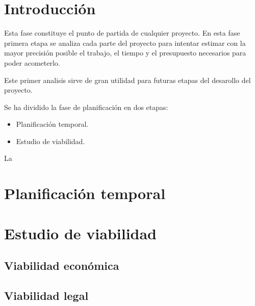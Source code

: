 
\section{Introducción}

Esta fase constituye el punto de partida de cualquier proyecto.
En esta fase primera etapa se analiza cada parte del proyecto para intentar estimar con la mayor precisión posible el trabajo, el tiempo y el presupuesto necesarios para poder acometerlo.

Este primer analisis sirve de gran utilidad para futuras etapas del desarollo del proyecto.

Se ha dividido la fase de planificación en dos etapas:

\begin{itemize}
	\item
	Planificación temporal.
	\item
	Estudio de viabilidad.
\end{itemize}

La 

\section{Planificación temporal}

\section{Estudio de viabilidad}

\subsection{Viabilidad económica}

\subsection{Viabilidad legal}


